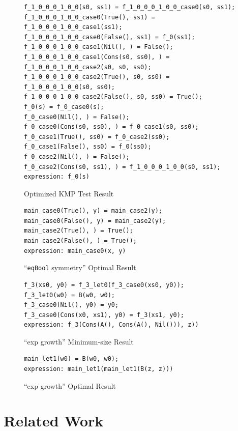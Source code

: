 \documentclass[submission,copyright,creativecommons]{eptcs}
\begin{document}
\begin{figure}
\begin{lstlisting}
f_1_0_0_0_1_0_0(s0, ss1) = f_1_0_0_0_1_0_0_case0(s0, ss1);
f_1_0_0_0_1_0_0_case0(True(), ss1) = f_1_0_0_0_1_0_0_case1(ss1);
f_1_0_0_0_1_0_0_case0(False(), ss1) = f_0(ss1);
f_1_0_0_0_1_0_0_case1(Nil(), ) = False();
f_1_0_0_0_1_0_0_case1(Cons(s0, ss0), ) = f_1_0_0_0_1_0_0_case2(s0, s0, ss0);
f_1_0_0_0_1_0_0_case2(True(), s0, ss0) = f_1_0_0_0_1_0_0(s0, ss0);
f_1_0_0_0_1_0_0_case2(False(), s0, ss0) = True();
f_0(s) = f_0_case0(s);
f_0_case0(Nil(), ) = False();
f_0_case0(Cons(s0, ss0), ) = f_0_case1(s0, ss0);
f_0_case1(True(), ss0) = f_0_case2(ss0);
f_0_case1(False(), ss0) = f_0(ss0);
f_0_case2(Nil(), ) = False();
f_0_case2(Cons(s0, ss1), ) = f_1_0_0_0_1_0_0(s0, ss1);
expression: f_0(s)
\end{lstlisting}
\caption{Optimized KMP Test Result}
\label{fig:KMPResult}
\end{figure}

\begin{figure}
\begin{lstlisting}
main_case0(True(), y) = main_case2(y);
main_case0(False(), y) = main_case2(y);
main_case2(True(), ) = True();
main_case2(False(), ) = True();
expression: main_case0(x, y)
\end{lstlisting}
\caption{``\texttt{eqBool} symmetry'' Optimal Result}
\label{fig:BoolEqSymResult}
\end{figure}

\begin{figure}
\begin{lstlisting}
f_3(xs0, y0) = f_3_let0(f_3_case0(xs0, y0));
f_3_let0(w0) = B(w0, w0);
f_3_case0(Nil(), y0) = y0;
f_3_case0(Cons(x0, xs1), y0) = f_3(xs1, y0);
expression: f_3(Cons(A(), Cons(A(), Nil())), z))
\end{lstlisting}
\caption{``exp growth'' Minimum-size Result}
\label{fig:ExpGrowthMinResult}
\end{figure}

\begin{figure}
\begin{lstlisting}
main_let1(w0) = B(w0, w0);
expression: main_let1(main_let1(B(z, z)))
\end{lstlisting}
\caption{``exp growth'' Optimal Result}
\label{fig:ExpGrowthOptResult}
\end{figure}

\section{Related Work}
\end{document}
